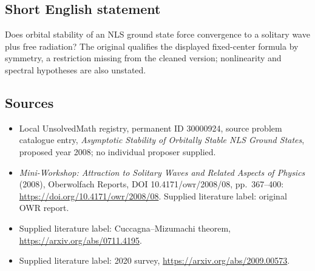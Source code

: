 \documentclass[11pt]{article}
\begin{document}
\subsection{Short English statement}
Does orbital stability of an NLS ground state force convergence to a solitary wave plus free radiation? The original qualifies the displayed fixed-center formula by symmetry, a restriction missing from the cleaned version; nonlinearity and spectral hypotheses are also unstated.
\subsection{Sources}
\begin{itemize}\item Local UnsolvedMath registry, permanent ID 30000924, source problem catalogue entry, \emph{Asymptotic Stability of Orbitally Stable NLS Ground States}, proposed year 2008; no individual proposer supplied.\item \emph{Mini-Workshop: Attraction to Solitary Waves and Related Aspects of Physics} (2008), Oberwolfach Reports, DOI 10.4171/owr/2008/08, pp.\ 367--400: \url{https://doi.org/10.4171/owr/2008/08}. Supplied literature label: original OWR report.\item Supplied literature label: Cuccagna--Mizumachi theorem, \url{https://arxiv.org/abs/0711.4195}.\item Supplied literature label: 2020 survey, \url{https://arxiv.org/abs/2009.00573}.\end{itemize}
\end{document}
